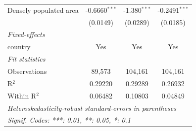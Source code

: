 \begin{tabular}{lccc}
   Densely populated area & -0.6660$^{***}$ & -1.380$^{***}$  & -0.2491$^{***}$\\   
                          & (0.0149)        & (0.0289)        & (0.0185)\\   
   \midrule
   \emph{Fixed-effects}\\
   country                & Yes             & Yes             & Yes\\  
   \midrule
   \emph{Fit statistics}\\
   Observations           & 89,573          & 104,161         & 104,161\\  
   R$^2$                  & 0.29220         & 0.29289         & 0.26932\\  
   Within R$^2$           & 0.06482         & 0.10803         & 0.04849\\  
   \midrule \midrule
   \multicolumn{4}{l}{\emph{Heteroskedasticity-robust standard-errors in parentheses}}\\
   \multicolumn{4}{l}{\emph{Signif. Codes: ***: 0.01, **: 0.05, *: 0.1}}\\
\end{tabular}
\par\endgroup



